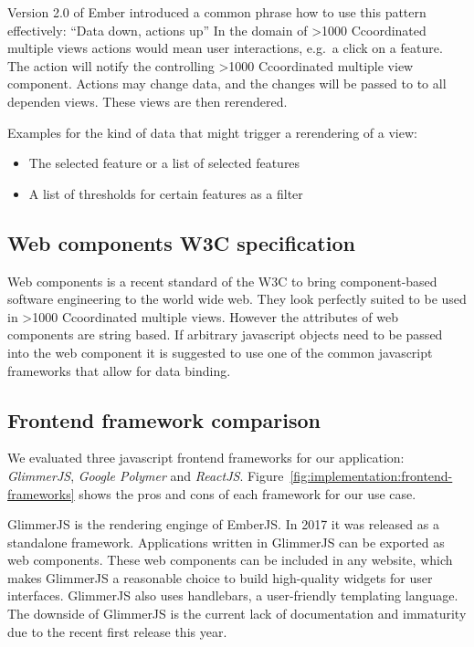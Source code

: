 \documentclass{article}
\newcommand\hmm[1]{\ifnum\ifhmode\spacefactor\else2000\fi>1000 \uppercase{#1}\else#1\fi}
\newcommand{\cmv}{\hmm{c}oordinated multiple view}
\newcommand{\cmvs}{\hmm{c}oordinated multiple views}
\begin{document}
Version 2.0 of Ember introduced a common phrase how to use this pattern effectively: ``Data down, actions up''\cite{Emberigniter2017}
In the domain of \cmvs{} actions would mean user interactions, e.g.\ a click on a feature.
The action will notify the controlling \cmv{} component.
Actions may change data, and the changes will be passed to to all dependen views.
These views are then rerendered.

Examples for the kind of data that might trigger a rerendering of a view:
\begin{itemize}
  \item
    The selected feature or a list of selected features
  \item
    A list of thresholds for certain features as a filter
\end{itemize}

\subsection{Web components W3C specification}

Web components is a recent standard of the W3C\cite{W3C2017} to bring component-based software engineering to the world wide web.
They look perfectly suited to be used in \cmvs{}.
However the attributes of web components are string based.
If arbitrary javascript objects need to be passed into the web component it is suggested to use one of the common javascript frameworks that allow for data binding.

\subsection{Frontend framework comparison}

We evaluated three javascript frontend frameworks for our application: \emph{GlimmerJS}, \emph{Google Polymer} and \emph{ReactJS}.
Figure~\ref{fig:implementation:frontend-frameworks} shows the pros and cons of each framework for our use case.

GlimmerJS is the rendering enginge of EmberJS\cite{Ember2017}.
In 2017 it was released as a standalone framework.
Applications written in GlimmerJS can be exported as web components.
These web components can be included in any website, which makes GlimmerJS a reasonable choice to build high-quality widgets for user interfaces.
GlimmerJS also uses handlebars\cite{Handlebars2017}, a user-friendly templating language.
The downside of GlimmerJS is the current lack of documentation and immaturity due to the recent first release this year.
\end{document}
